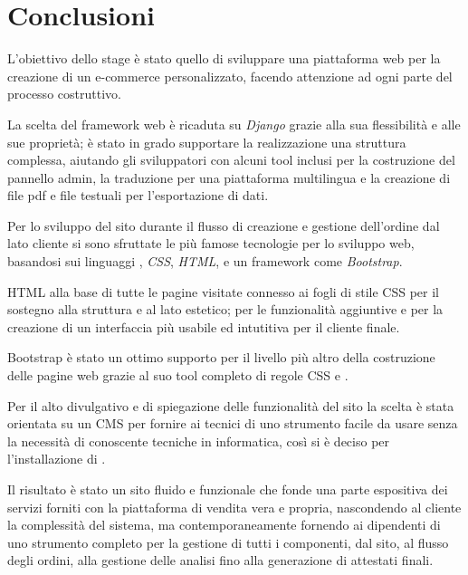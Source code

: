 \chapter{Conclusioni} 
\label{chp:conclusioni}
L’obiettivo dello stage è stato quello di sviluppare una piattaforma web per la creazione di un e-commerce personalizzato, facendo attenzione ad ogni parte del processo costruttivo.

La scelta del framework web è ricaduta su \emph{Django} grazie alla sua flessibilità e alle sue proprietà; è stato in grado supportare la realizzazione una struttura complessa, aiutando gli sviluppatori con alcuni tool inclusi per la costruzione del pannello admin, la traduzione per una piattaforma multilingua e la creazione di file pdf e file testuali per l'esportazione di dati.

Per lo sviluppo del sito durante il flusso di creazione e gestione dell'ordine dal lato cliente si sono sfruttate le più famose tecnologie per lo sviluppo web, basandosi sui linguaggi \emph{{\js}}, \emph{CSS}, \emph{HTML}, e un framework come \emph{Bootstrap}.

HTML alla base di tutte le pagine visitate connesso ai fogli di stile CSS per il sostegno alla struttura e al lato estetico; {\js} per le funzionalità aggiuntive e per la creazione di un interfaccia più usabile ed intutitiva per il cliente finale.

Bootstrap è stato un ottimo supporto per il livello più altro della costruzione delle pagine web grazie al suo tool completo di regole CSS e {\js}.

Per il alto divulgativo e di spiegazione delle funzionalità del sito la scelta è stata orientata su un CMS per fornire ai tecnici di {\fem} uno strumento facile da usare senza la necessità di conoscente tecniche in informatica, così si è deciso per l'installazione di {\wp}.

Il risultato è stato un sito fluido e funzionale che fonde una parte espositiva dei servizi forniti con la piattaforma di vendita vera e propria, nascondendo al cliente la complessità del sistema, ma contemporaneamente fornendo ai dipendenti di {\fem} uno strumento completo per la gestione di tutti i componenti, dal sito, al flusso degli ordini, alla gestione delle analisi fino alla generazione di attestati finali.
